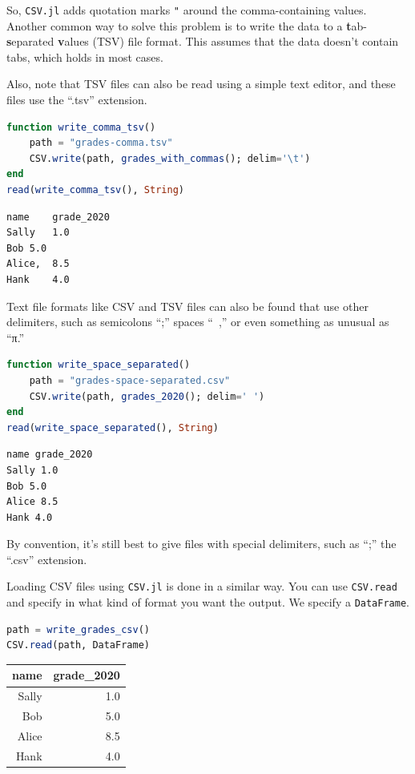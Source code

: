 \documentclass[
  notoc %
]{tufte-book}
\newcommand{\passthrough}[1]{#1}
\begin{document}
So, \passthrough{\lstinline!CSV.jl!} adds quotation marks
\passthrough{\lstinline!"!} around the comma-containing values. Another
common way to solve this problem is to write the data to a
\textbf{t}ab-\textbf{s}eparated \textbf{v}alues (TSV) file format. This
assumes that the data doesn't contain tabs, which holds in most cases.

Also, note that TSV files can also be read using a simple text editor,
and these files use the ``.tsv'' extension.

\begin{lstlisting}[language=Julia]
function write_comma_tsv()
    path = "grades-comma.tsv"
    CSV.write(path, grades_with_commas(); delim='\t')
end
read(write_comma_tsv(), String)
\end{lstlisting}

\begin{lstlisting}[language=Output]
name    grade_2020
Sally   1.0
Bob 5.0
Alice,  8.5
Hank    4.0

\end{lstlisting}

Text file formats like CSV and TSV files can also be found that use
other delimiters, such as semicolons ``;'' spaces ``~,'' or even
something as unusual as ``π.''

\begin{lstlisting}[language=Julia]
function write_space_separated()
    path = "grades-space-separated.csv"
    CSV.write(path, grades_2020(); delim=' ')
end
read(write_space_separated(), String)
\end{lstlisting}

\begin{lstlisting}[language=Output]
name grade_2020
Sally 1.0
Bob 5.0
Alice 8.5
Hank 4.0

\end{lstlisting}

By convention, it's still best to give files with special delimiters,
such as ``;'' the ``.csv'' extension.

Loading CSV files using \passthrough{\lstinline!CSV.jl!} is done in a
similar way. You can use \passthrough{\lstinline!CSV.read!} and specify
in what kind of format you want the output. We specify a
\passthrough{\lstinline!DataFrame!}.

\begin{lstlisting}[language=Julia]
path = write_grades_csv()
CSV.read(path, DataFrame)
\end{lstlisting}

\begin{longtable}[]{@{}rr@{}}
\toprule
name & grade\_2020 \\
\midrule
\endhead
Sally & 1.0 \\
Bob & 5.0 \\
Alice & 8.5 \\
Hank & 4.0 \\
\bottomrule
\end{longtable}
\end{document}
